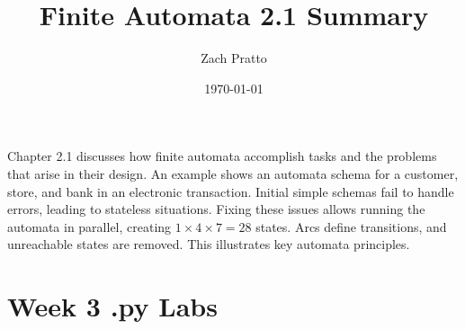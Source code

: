 \documentclass{article}
\theoremstyle{theorem}
\theoremstyle{definition}
\theoremstyle{remark}
\begin{document}
\title{Finite Automata 2.1 Summary}
\author{Zach Pratto}
\date{\today}
\maketitle

Chapter 2.1 discusses how finite automata accomplish tasks and the problems that arise in their design. An example shows an automata schema for a customer, store, and bank in an electronic transaction. Initial simple schemas fail to handle errors, leading to stateless situations. Fixing these issues allows running the automata in parallel, creating $1 \times 4 \times 7 = 28$ states. Arcs define transitions, and unreachable states are removed. This illustrates key automata principles.

\section*{Week 3 .py Labs}
\end{document}
